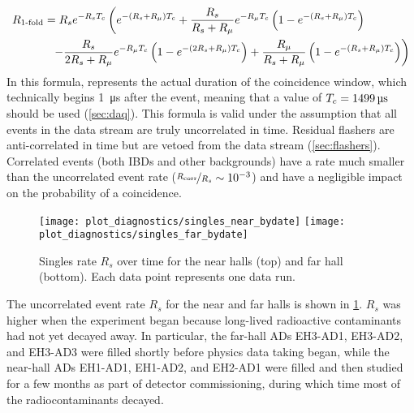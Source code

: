 \begin{align}
    \label{eq:rsingles}
    \begin{split}
        R_{\text{\fold{1}}}
          &= R_s e^{-R_s\tc}
          \left(
              e^{-(R_s + R_\mu)\tc} +
              \frac{R_s}{R_s+R_\mu} e^{-R_\mu\tc}
              \left(
                  1 - e^{-(R_s + R_\mu)\tc}
              \right)
          \right. \\
          &\ \ %
          \left. - \frac{R_s}{2R_s + R_\mu} e^{-R_\mu\tc}
              \left(
                  1 - e^{-(2R_s + R_\mu)\tc}
              \right) +
              \frac{R_\mu}{R_s + R_\mu}
              \left(
                  1 - e^{-(R_s + R_\mu)\tc}
              \right)
          \right)
    \end{split}
\end{align}
In this formula, \tc{} represents the actual duration of the coincidence window,
which technically begins \SI{1}{\micro\second} after the event,
meaning that a value of $T_c=\SI{1499}{\micro\second}$ should be used (\cref{sec:daq}).
This formula is valid under the assumption that all
events in the data stream are truly uncorrelated in time.
Residual flashers are anti-correlated in time
but are vetoed from the data stream (\cref{sec:flashers}).
Correlated events (both IBDs and other backgrounds)
have a rate much smaller than the uncorrelated event rate
($\nicefrac{R_{\text{corr}}}{R_s} \sim 10^{-3}$)
and have a negligible impact on the probability of a  coincidence.

\begin{figure}
    \centering
    \texttt{[image: plot\_diagnostics/singles\_near\_bydate]}
    \texttt{[image: plot\_diagnostics/singles\_far\_bydate]}
    \caption[Singles rate over time]{
        Singles rate $R_s$ over time for
        the near halls (top) and far hall (bottom).
        Each data point represents one data run.
    }
    \label{fig:singles}
\end{figure}

The uncorrelated event rate $R_s$ for the near and far halls is shown in
\cref{fig:singles}.
$R_s$ was higher when the experiment began because long-lived
radioactive contaminants had not yet decayed away.
In particular, the far-hall ADs EH3-AD1, EH3-AD2, and EH3-AD3
were filled shortly before physics data taking began,
while the near-hall ADs EH1-AD1, EH1-AD2, and EH2-AD1
were filled and then studied for a few months
as part of detector commissioning, during which time
most of the radiocontaminants decayed.


